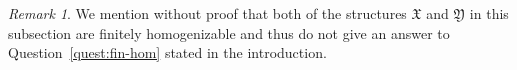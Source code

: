 \documentclass{amsart}
\theoremstyle{definition}
\newtheorem{definition}[theorem]{Definition}
\theoremstyle{remark}
\newtheorem{remark}[theorem]{Remark}
\numberwithin{equation}{section}
\newcommand\red[1]{\textcolor{red}{#1}}
\DeclareMathOperator{\I}{\operatorname{I}}
\newcommand{\atoms}{({\mathbb Q};=)}
\newcommand{\john}{\mathfrak{J}}
\newcommand{\fx}{\mathfrak{X}}
\newcommand{\fy}{\mathfrak{Y}}
\newcommand{\fz}{\mathfrak{Z}}
\begin{document}
    \begin{remark} 
    We mention without proof that both of the structures $\fx$ and $\fy$ in this subsection are finitely homogenizable 
    and thus do not give an answer to Question~\ref{quest:fin-hom} stated in the introduction. 
\end{remark}

\end{document}
